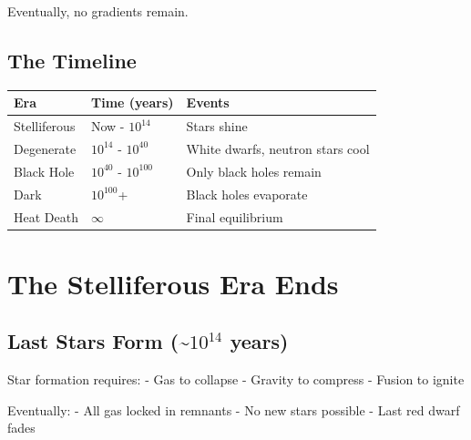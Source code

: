 \documentclass[
  11pt,
  letterpaper,
  twoside,
  openright]{book}
\begin{document}
Eventually, no gradients remain.

\subsection{The Timeline}\label{the-timeline}

\begin{longtable}[]{@{}
  >{\raggedright\arraybackslash}p{}
  >{\raggedright\arraybackslash}p{}
  >{\raggedright\arraybackslash}p{}@{}}
\toprule\noalign{}
\begin{minipage}[b]{\linewidth}\raggedright
Era
\end{minipage} & \begin{minipage}[b]{\linewidth}\raggedright
Time (years)
\end{minipage} & \begin{minipage}[b]{\linewidth}\raggedright
Events
\end{minipage} \\
\midrule\noalign{}
\endhead
\bottomrule\noalign{}
\endlastfoot
Stelliferous & Now - \(10^{14}\) & Stars shine \\
Degenerate & \(10^{14}\) - \(10^{40}\) & White dwarfs, neutron stars
cool \\
Black Hole & \(10^{40}\) - \(10^{100}\) & Only black holes remain \\
Dark & \(10^{100}\)+ & Black holes evaporate \\
Heat Death & \(\infty\) & Final equilibrium \\
\end{longtable}

\section{The Stelliferous Era Ends}\label{the-stelliferous-era-ends}

\subsection{\texorpdfstring{Last Stars Form
(\textasciitilde{}\(10^{14}\)
years)}{Last Stars Form (\textasciitilde10\^{}\{14\} years)}}\label{last-stars-form-1014-years}

Star formation requires: - Gas to collapse - Gravity to compress -
Fusion to ignite

Eventually: - All gas locked in remnants - No new stars possible - Last
red dwarf fades
\end{document}

